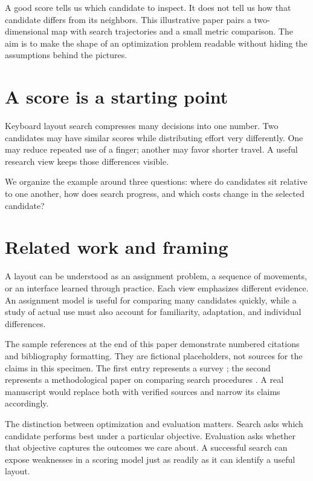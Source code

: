 \documentclass{gecko-paper}
\begin{document}
\makepapertitle
\begin{paperabstract}
A good score tells us which candidate to inspect. It does not tell us how that candidate differs from its neighbors. This illustrative paper pairs a two-dimensional map with search trajectories and a small metric comparison. The aim is to make the shape of an optimization problem readable without hiding the assumptions behind the pictures.
\end{paperabstract}

\begin{paperbody}
\section{A score is a starting point}
Keyboard layout search compresses many decisions into one number. Two candidates may have similar scores while distributing effort very differently. One may reduce repeated use of a finger; another may favor shorter travel. A useful research view keeps those differences visible.

We organize the example around three questions: where do candidates sit relative to one another, how does search progress, and which costs change in the selected candidate?

\section{Related work and framing}

A layout can be understood as an assignment problem, a sequence of movements, or an interface learned through practice. Each view emphasizes different evidence. An assignment model is useful for comparing many candidates quickly, while a study of actual use must also account for familiarity, adaptation, and individual differences.

The sample references at the end of this paper demonstrate numbered citations and bibliography formatting. They are fictional placeholders, not sources for the claims in this specimen. The first entry represents a survey ; the second represents a methodological paper on comparing search procedures . A real manuscript would replace both with verified sources and narrow its claims accordingly.

The distinction between optimization and evaluation matters. Search asks which candidate performs best under a particular objective. Evaluation asks whether that objective captures the outcomes we care about. A successful search can expose weaknesses in a scoring model just as readily as it can identify a useful layout.


\end{paperbody}
\end{document}
